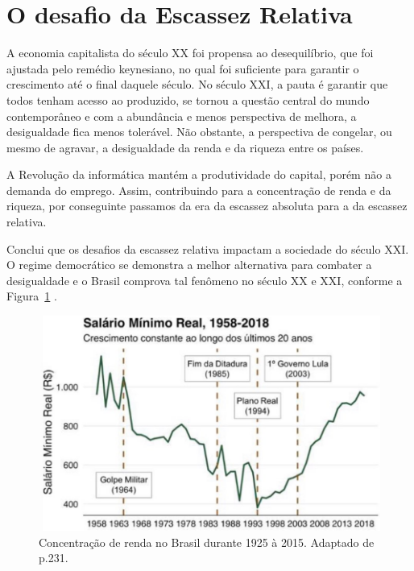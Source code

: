 \section{O desafio da Escassez Relativa}

A economia capitalista do século XX foi propensa ao desequilíbrio, que foi ajustada pelo remédio keynesiano, no qual foi suficiente para garantir o crescimento até o final daquele século.
No século XXI, a pauta é garantir que todos tenham acesso ao produzido, se tornou a questão central do mundo contemporâneo e com a abundância e menos perspectiva de melhora, a desigualdade fica menos tolerável.
Não obstante, a perspectiva de congelar, ou mesmo de agravar, a desigualdade da renda e da riqueza entre os países.

A Revolução da informática mantém a produtividade do capital, porém não a demanda do emprego.
Assim, contribuindo para a concentração de renda e da riqueza, por conseguinte passamos da era da escassez absoluta para a da escassez relativa.

Conclui que os desafios da escassez relativa impactam a sociedade do século XXI.
O regime democrático se demonstra a melhor alternativa para combater a desigualdade \cite{dahl2003democracy} e o Brasil comprova tal fenômeno no século XX e XXI, conforme a Figura~\ref{fig:salario-real} \cite{souza2016desigualdade}.



\begin{figure}[!ht]
    \centering
    \includegraphics[width=.8\linewidth]{img/salario-minimo-real.png}
    \caption{Concentração de renda no Brasil durante 1925 à 2015. 
    Adaptado de  p.231.}
    \label{fig:salario-real}
\end{figure}